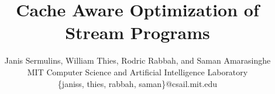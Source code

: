 \documentclass{sig-alternate}
\title{Cache Aware Optimization of Stream Programs}
\author{
	Janis Sermulins, William Thies, Rodric Rabbah, and Saman Amarasinghe\\
	\small MIT Computer Science and Artificial Intelligence Laboratory\\
	\small \{janiss, thies, rabbah, saman\}@csail.mit.edu
}
\begin{document}
\maketitle

\begin{abstract}

\end{abstract}








%

{\tiny
  
  
}
\end{document}
